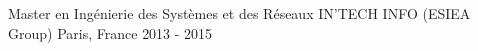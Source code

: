 

\begin{cventries}

  \cventry
    {Master en Ingénierie des Systèmes et des Réseaux} %
    {IN'TECH INFO (ESIEA Group)} %
    {Paris, France} %
    {2013 - 2015} %
    {}

\end{cventries}
